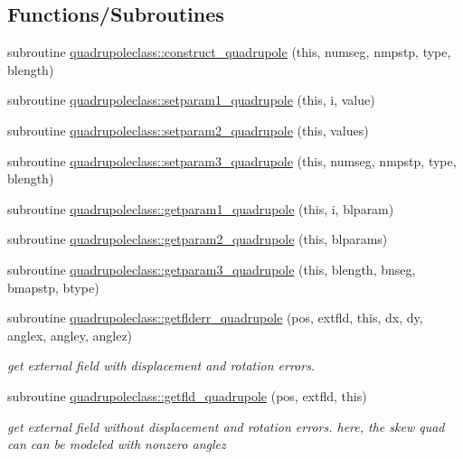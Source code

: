 \subsection*{Functions/\+Subroutines}
\begin{DoxyCompactItemize}
\item 
subroutine \mbox{\hyperlink{namespacequadrupoleclass_afebabbf596b8330dcdbc2741bb939b5c}{quadrupoleclass\+::construct\+\_\+quadrupole}} (this, numseg, nmpstp, type, blength)
\item 
subroutine \mbox{\hyperlink{namespacequadrupoleclass_a34d611929c447e03e1c12c2f72888ca5}{quadrupoleclass\+::setparam1\+\_\+quadrupole}} (this, i, value)
\item 
subroutine \mbox{\hyperlink{namespacequadrupoleclass_a400dc2305f0aca6ab6d6b5475a91363a}{quadrupoleclass\+::setparam2\+\_\+quadrupole}} (this, values)
\item 
subroutine \mbox{\hyperlink{namespacequadrupoleclass_a6e3465265973203b8452b1b2463a2e4b}{quadrupoleclass\+::setparam3\+\_\+quadrupole}} (this, numseg, nmpstp, type, blength)
\item 
subroutine \mbox{\hyperlink{namespacequadrupoleclass_a48e1ded5cfc486c78a47d556fd008e29}{quadrupoleclass\+::getparam1\+\_\+quadrupole}} (this, i, blparam)
\item 
subroutine \mbox{\hyperlink{namespacequadrupoleclass_a8991350fe610b73bca6787f4c528753c}{quadrupoleclass\+::getparam2\+\_\+quadrupole}} (this, blparams)
\item 
subroutine \mbox{\hyperlink{namespacequadrupoleclass_ae5c8a42ae81e07dcb9eb91681d28f04e}{quadrupoleclass\+::getparam3\+\_\+quadrupole}} (this, blength, bnseg, bmapstp, btype)
\item 
subroutine \mbox{\hyperlink{namespacequadrupoleclass_a41791f03ec33f0255e54ebc7b9519170}{quadrupoleclass\+::getflderr\+\_\+quadrupole}} (pos, extfld, this, dx, dy, anglex, angley, anglez)
\begin{DoxyCompactList}\small\item\em get external field with displacement and rotation errors. \end{DoxyCompactList}\item 
subroutine \mbox{\hyperlink{namespacequadrupoleclass_a1d1bf0b4ea88a1cd0c0832a178fc80e5}{quadrupoleclass\+::getfld\+\_\+quadrupole}} (pos, extfld, this)
\begin{DoxyCompactList}\small\item\em get external field without displacement and rotation errors. here, the skew quad can can be modeled with nonzero anglez \end{DoxyCompactList}\item 

\end{DoxyCompactItemize}
